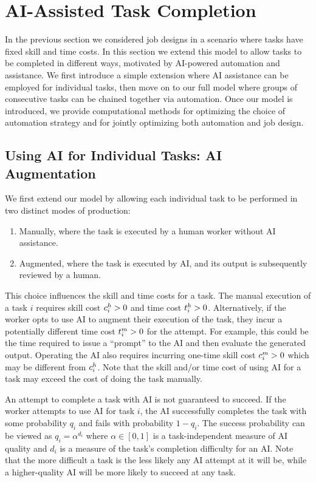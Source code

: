 \documentclass{article}
\theoremstyle{plain}
\theoremstyle{plain}
\begin{document}
\section{AI-Assisted Task Completion}

In the previous section we considered job designs in a scenario where  tasks have fixed skill and time costs.  In this section we extend this model to allow tasks to be completed in different ways, motivated by AI-powered automation and assistance.  We first introduce a simple extension where AI assistance can be employed for individual tasks, then move on to our full model where groups of consecutive tasks can be chained together via automation.  Once our model is introduced, we provide computational methods for optimizing the choice of automation strategy and for jointly optimizing both automation and job design.

\subsection{Using AI for Individual Tasks: AI Augmentation}

We first extend our model by allowing each individual task to be performed in two distinct modes of production:
\begin{enumerate}
\item Manually, where the task is executed by a human worker without AI assistance.
\item Augmented, where the task is executed by AI, and its output is subsequently reviewed by a human.
\end{enumerate}
This choice influences the skill and time costs for a task.  The manual execution of a task $i$ requires skill cost $c^{h}_{i} > 0$ and time cost $t^{h}_{i} > 0$.
Alternatively, if the worker opts to use AI to augment their execution of the task, they incur a potentially different time cost $t^{m}_{i} > 0$ for the attempt.  For example, this could be the time required to issue a ``prompt'' to the AI and then evaluate the generated output. 
Operating the AI also requires incurring one-time skill cost $c^{m}_{i} > 0$ which may be different from $c^{h}_{i}$.  Note that the skill and/or time cost of using AI for a task may exceed the cost of doing the task manually.

An attempt to complete a task with AI is not guaranteed to succeed. If the worker attempts to use AI for task $i$, the AI successfully completes the task with some probability $q_i$ and fails with probability $1-q_i$. 
The success probability can be viewed as $q_i=\alpha^{d_i}$ where $\alpha \in [0,1]$ is a task-independent measure of AI quality and $d_i$ is a measure of the task's completion difficulty for an AI.  Note that the more difficult a task is the less likely any AI attempt at it will be, while a higher-quality AI will be more likely to succeed at any task.
\end{document}
